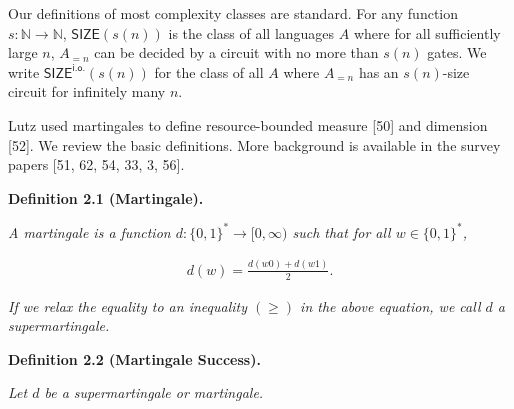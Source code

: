 \documentclass[10pt,a4paper]{article}
\begin{document}
Our definitions of most complexity classes are standard. For any function $s:\mathbb{N}\to\mathbb{N}$, $\mathsf{SIZE}\!(s(n))$ is the class of all
languages $A$ where for all sufficiently large $n$, $A_{=n}$ can be decided
by a circuit with no more than $s(n)$ gates. We write $\mathsf{SIZE}^{\mathsf{i.o.}}\!\!(s(n))$ for the class of all $A$ where $A_{=n}$ has an $s(n)$-size circuit for infinitely many $n$.\par




Lutz used martingales to define resource-bounded measure
[50] and dimension [52].
We review the basic definitions. More background is
available in the survey papers
[51, 62, 54, 33, 3, 56].\par





\par\medskip\noindent\textbf{
\textbf{Definition 2.1}\textbf{ }(Martingale)\textbf{.}
}\par



\emph{A martingale is a function $d:\{0,1\}^{*}\to[0,\infty)$ such
that for all $w\in\{0,1\}^{*}$,}\par


\[\begin{gathered}
d(w)=\frac{d(w0)+d(w1)}{2}.
\end{gathered}\]


\emph{If we relax the equality to an inequality $(\geq)$ in the above equation, we call
$d$ a supermartingale.}\par







\par\medskip\noindent\textbf{
\textbf{Definition 2.2}\textbf{ }(Martingale Success)\textbf{.}
}\par



\emph{Let $d$ be a supermartingale or martingale.}\par
\end{document}
